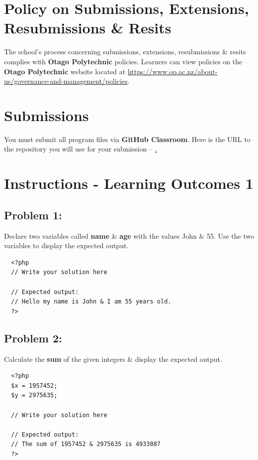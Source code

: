 \documentclass{article}
\begin{document}
\section*{Policy on Submissions, Extensions, Resubmissions \& Resits}
The school's process concerning submissions, extensions, resubmissions \& resits complies with \textbf{Otago Polytechnic} policies. Learners can view policies on the \textbf{Otago Polytechnic} website located at \href{https://www.op.ac.nz/about-us/governance-and-management/policies}{https://www.op.ac.nz/about-us/governance-and-management/policies}.

\section*{Submissions}
You must submit all program files via \textbf{GitHub Classroom}. Here is the URL to the repository you will use for your submission – \href{https://classroom.github.com/a/fqBug5Kt}. 

\section*{Instructions - Learning Outcomes 1}

\subsection*{Problem 1:} 
Declare two variables called \textbf{name} \& \textbf{age} with the values John \& 55. Use the two variables to display the expected output.

\begin{verbatim}
  <?php
  // Write your solution here

  // Expected output:
  // Hello my name is John & I am 55 years old.
  ?>
\end{verbatim}

\subsection*{Problem 2:} Calculate the \textbf{sum} of the given integers \& display the expected output.

\begin{verbatim}
  <?php
  $x = 1957452;
  $y = 2975635;

  // Write your solution here

  // Expected output:
  // The sum of 1957452 & 2975635 is 4933087
  ?>
\end{verbatim}
\end{document}
